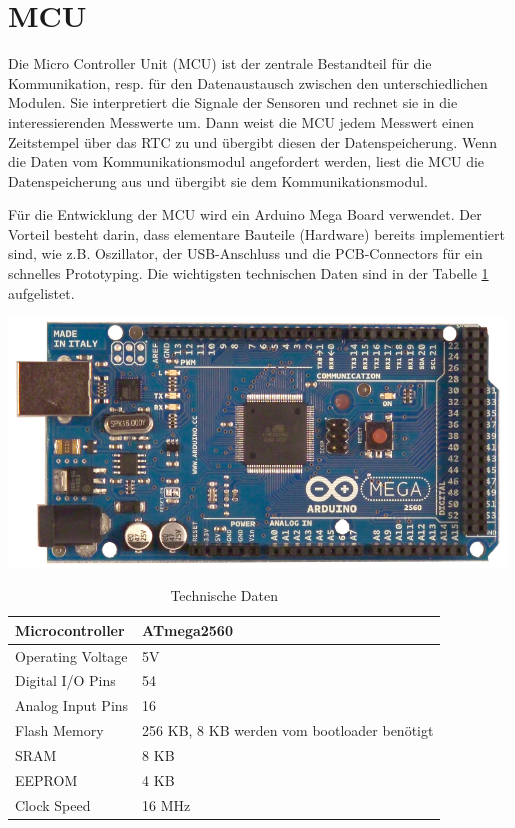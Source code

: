 \section{MCU}
\label{chap:MCU}
Die Micro Controller Unit (MCU) ist der zentrale Bestandteil für die Kommunikation, resp. für den Datenaustausch zwischen den unterschiedlichen Modulen. Sie interpretiert die Signale der Sensoren und rechnet sie in die interessierenden Messwerte um. Dann weist die MCU jedem Messwert einen Zeitstempel über das RTC zu und übergibt diesen der Datenspeicherung. Wenn die Daten vom Kommunikationsmodul angefordert werden, liest die MCU die Datenspeicherung aus und übergibt sie dem Kommunikationsmodul.\\

{\begin{minipage}[b][130pt][t]{0.5\textwidth}
Für die Entwicklung der MCU wird ein Arduino Mega Board verwendet. Der Vorteil besteht darin, dass elementare Bauteile (Hardware) bereits implementiert sind, wie z.B. Oszillator, der USB-Anschluss und die PCB-Connectors für ein schnelles Prototyping. Die wichtigsten technischen Daten sind in der Tabelle \ref{tab:arduinoMega_technischeDaten} aufgelistet.\\
\end{minipage}}
\hfill
{\begin{minipage}[b][130pt][t]{0.49\textwidth}
\centering
\includegraphics[width=0.99\textwidth]{graphics/MCU/arduino_mega.png}
\label{fig:arduinoMega}
\end{minipage}}

\begin{table}[h]
\centering
\caption{Technische Daten \cite[S.3]{arduinoMega}}
\begin{tabular}{|l|l|}
\hline 
Microcontroller & ATmega2560 \\ 
\hline 
Operating Voltage & 5V \\ 
\hline 
Digital I/O Pins & 54  \\ 
\hline 
Analog Input Pins & 16 \\ 
\hline 
Flash Memory & 256 KB, 8 KB werden vom bootloader benötigt\\ 
\hline 
SRAM & 8 KB \\ 
\hline 
EEPROM & 4 KB \\ 
\hline 
Clock Speed & 16 MHz \\ 
\hline 
\end{tabular}
\label{tab:arduinoMega_technischeDaten}
\end{table}
